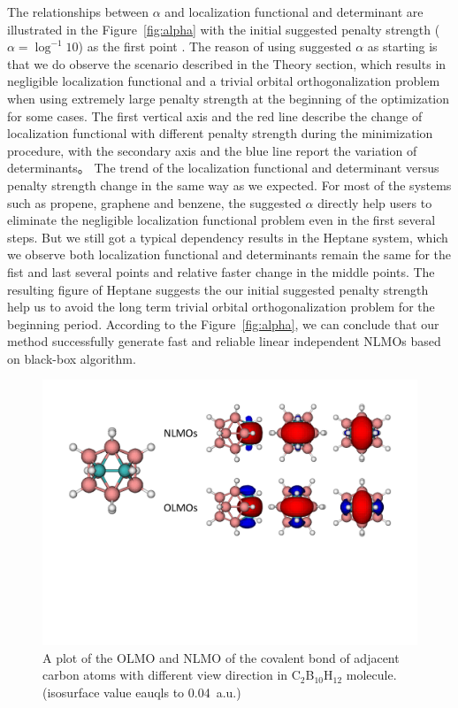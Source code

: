 \documentclass[aps,prl,reprint,amsmath,amssymb]{revtex4-1}
\begin{document}
The relationships between $\alpha$ and localization functional and determinant are illustrated in the Figure~\ref{fig:alpha} with the initial suggested penalty strength ($\alpha = \log^{-1} 10$) as the first point .
The reason of using suggested $\alpha$ as starting is that we do observe the scenario described in the Theory section, which results in negligible localization functional and a trivial orbital orthogonalization problem when using extremely large penalty strength at the beginning of the optimization for some cases.
The first vertical axis and the red line describe the change of localization functional with different penalty strength during the minimization procedure, with the secondary axis and the blue line report the variation of determinants。
The trend of the localization functional and determinant versus penalty strength change in the same way as we expected.
For most of the systems such as propene, graphene and benzene, the suggested $\alpha$ directly help users to eliminate the  negligible localization functional problem even in the first several steps.  
But we still got a typical dependency results in the Heptane system, which we observe both localization functional and determinants remain the same for the fist and last several points and relative faster change in the middle points.
The resulting figure of Heptane suggests the our initial suggested penalty strength help us to avoid the long term trivial orbital orthogonalization problem for the beginning period.
According to the Figure~\ref{fig:alpha}, we can conclude that our method successfully generate fast and reliable linear independent NLMOs based on black-box algorithm.

\begin{figure}[hbpt]
\centering
\includegraphics[width=\textwidth]{figure_3.pdf}
\caption{A plot of the OLMO and NLMO of the covalent bond of adjacent carbon atoms with different view direction  in C$_2$B$_{10}$H$_{12}$ molecule. (isosurface value eauqls to 0.04~a.u.)}
\label{fig:boro}
\end{figure}
\end{document}
